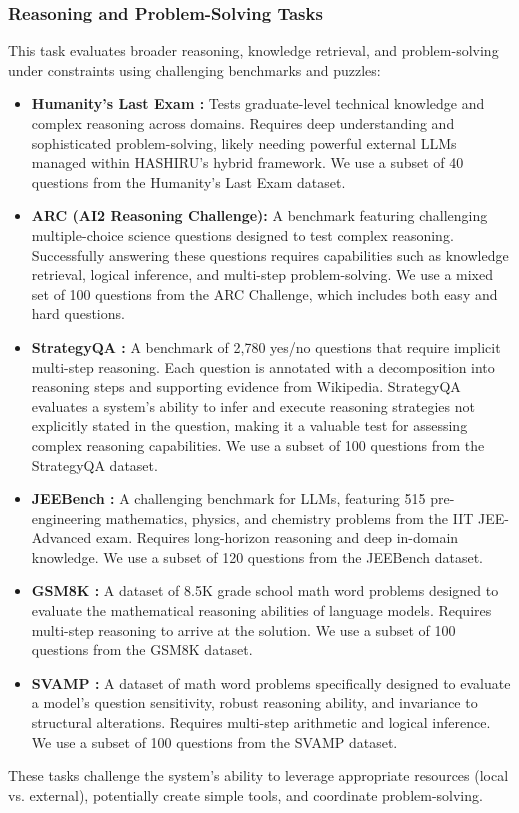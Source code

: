 \documentclass[conference]{IEEEtran}
\begin{document}
\subsubsection{Reasoning and Problem-Solving Tasks}
This task evaluates broader reasoning, knowledge retrieval, and problem-solving under constraints using challenging benchmarks and puzzles:
\begin{itemize}
    \item \textbf{Humanity's Last Exam \cite{phan2025humanitysexam}:} Tests graduate-level technical knowledge and complex reasoning across domains. Requires deep understanding and sophisticated problem-solving, likely needing powerful external LLMs managed within HASHIRU's hybrid framework.
    We use a subset of 40 questions from the Humanity's Last Exam dataset.
    \item \textbf{ARC (AI2 Reasoning Challenge)\cite{boratko2018systematic}:} A benchmark featuring challenging multiple-choice science questions designed to test complex reasoning. Successfully answering these questions requires capabilities such as knowledge retrieval, logical inference, and multi-step problem-solving.
    We use a mixed set of 100 questions from the ARC Challenge, which includes both easy and hard questions.
    \item \textbf{StrategyQA \cite{geva2021strategyqa}:} A benchmark of 2,780 yes/no questions that require implicit multi-step reasoning. Each question is annotated with a decomposition into reasoning steps and supporting evidence from Wikipedia. StrategyQA evaluates a system's ability to infer and execute reasoning strategies not explicitly stated in the question, making it a valuable test for assessing complex reasoning capabilities.
    We use a subset of 100 questions from the StrategyQA dataset.
    \item \textbf{JEEBench \cite{arora-etal-2023-llms}:} A challenging benchmark for LLMs, featuring 515 pre-engineering mathematics, physics, and chemistry problems from the IIT JEE-Advanced exam. Requires long-horizon reasoning and deep in-domain knowledge. 
    We use a subset of 120 questions from the JEEBench dataset.
    \item \textbf{GSM8K \cite{cobbe2021gsm8k}:} A dataset of 8.5K grade school math word problems designed to evaluate the mathematical reasoning abilities of language models. Requires multi-step reasoning to arrive at the solution.
    We use a subset of 100 questions from the GSM8K dataset.
    \item \textbf{SVAMP \cite{patel2021nlp}:} A dataset of math word problems specifically designed to evaluate a model's question sensitivity, robust reasoning ability, and invariance to structural alterations. Requires multi-step arithmetic and logical inference.
    We use a subset of 100 questions from the SVAMP dataset.
\end{itemize}
These tasks challenge the system's ability to leverage appropriate resources (local vs. external), potentially create simple tools, and coordinate problem-solving.
\end{document}
